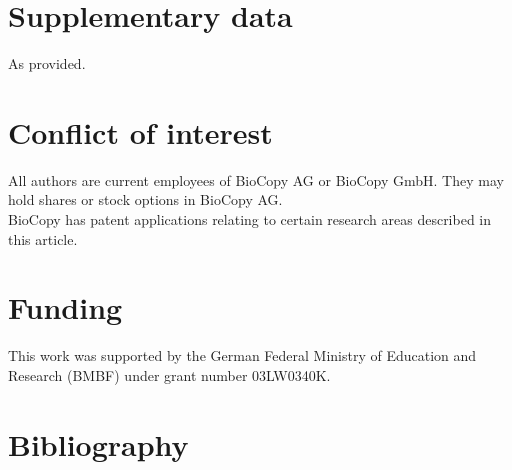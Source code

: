 \documentclass[times, twoside, watermark]{zHenriquesLab-StyleBioRxiv}
\begin{document}
\section*{Supplementary data}
    As provided.
    
\section*{Conflict of interest}
    All authors are current employees of BioCopy AG or BioCopy GmbH. They may hold shares or stock options in BioCopy AG. \\
    BioCopy has patent applications relating to certain research areas described in this article.

\section*{Funding}
    This work was supported by the German Federal Ministry of Education and Research (BMBF) under grant number 03LW0340K. 
    
\section*{Bibliography}

\end{document}
